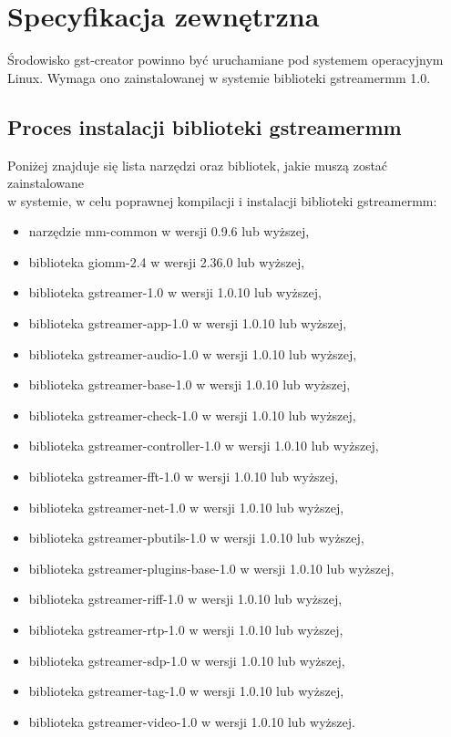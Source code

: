\documentclass[12pt]{article}
\begin{document}
\section{Specyfikacja zewnętrzna}
Środowisko gst-creator powinno być uruchamiane pod systemem operacyjnym Linux. Wymaga ono zainstalowanej w systemie biblioteki gstreamermm 1.0.
\subsection{Proces instalacji biblioteki gstreamermm}
Poniżej znajduje się lista narzędzi oraz bibliotek, jakie muszą zostać zainstalowane \\w systemie, w celu poprawnej kompilacji i instalacji biblioteki gstreamermm:
\begin{itemize}
  \setlength{\itemsep}{0em}
\item narzędzie mm-common w wersji 0.9.6 lub wyższej,
\item biblioteka giomm-2.4 w wersji 2.36.0 lub wyższej,
\item biblioteka gstreamer-1.0 w wersji 1.0.10 lub wyższej,
\item biblioteka gstreamer-app-1.0 w wersji 1.0.10 lub wyższej,
\item biblioteka gstreamer-audio-1.0 w wersji 1.0.10 lub wyższej,
\item biblioteka gstreamer-base-1.0 w wersji 1.0.10 lub wyższej,
\item biblioteka gstreamer-check-1.0 w wersji 1.0.10 lub wyższej,
\item biblioteka gstreamer-controller-1.0 w wersji 1.0.10 lub wyższej,
\item biblioteka gstreamer-fft-1.0 w wersji 1.0.10 lub wyższej,
\item biblioteka gstreamer-net-1.0 w wersji 1.0.10 lub wyższej,
\item biblioteka gstreamer-pbutils-1.0 w wersji 1.0.10 lub wyższej,
\item biblioteka gstreamer-plugins-base-1.0 w wersji 1.0.10 lub wyższej,
\item biblioteka gstreamer-riff-1.0 w wersji 1.0.10 lub wyższej,
\item biblioteka gstreamer-rtp-1.0 w wersji 1.0.10 lub wyższej,
\item biblioteka gstreamer-sdp-1.0 w wersji 1.0.10 lub wyższej,
\item biblioteka gstreamer-tag-1.0 w wersji 1.0.10 lub wyższej,
\item biblioteka gstreamer-video-1.0 w wersji 1.0.10 lub wyższej.
\end{itemize}
\end{document}
